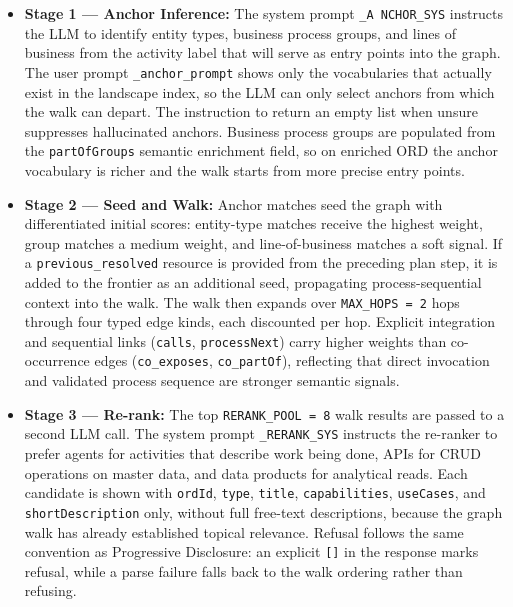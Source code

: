 \begin{itemize}
  \item \textbf{Stage 1 --- Anchor Inference:} The system prompt \texttt{\_A  NCHOR\_SYS} instructs the LLM to identify entity types, business process groups, and lines of business from the activity label that will serve as entry points into the graph. The user prompt \texttt{\_anchor\_prompt} shows only the vocabularies that actually exist in the landscape index, so the LLM can only select anchors from which the walk can depart. The instruction to return an empty list when unsure suppresses hallucinated anchors. Business process groups are populated from the \texttt{partOfGroups} semantic enrichment field, so on enriched ORD the anchor vocabulary is richer and the walk starts from more precise entry points.

  \item \textbf{Stage 2 --- Seed and Walk:} Anchor matches seed the graph with differentiated initial scores: entity-type matches receive the highest weight, group matches a medium weight, and line-of-business matches a soft signal. If a \texttt{previous\_resolved} resource is provided from the preceding plan step, it is added to the frontier as an additional seed, propagating process-sequential context into the walk. The walk then expands over \texttt{MAX\_HOPS = 2} hops through four typed edge kinds, each discounted per hop. Explicit integration and sequential links (\texttt{calls}, \texttt{processNext}) carry higher weights than co-occurrence edges (\texttt{co\_exposes}, \texttt{co\_partOf}), reflecting that direct invocation and validated process sequence are stronger semantic signals.

  \item \textbf{Stage 3 --- Re-rank:} The top \texttt{RERANK\_POOL = 8} walk results are passed to a second LLM call. The system prompt \texttt{\_RERANK\_SYS} instructs the re-ranker to prefer agents for activities that describe work being done, APIs for CRUD operations on master data, and data products for analytical reads. Each candidate is shown with \texttt{ordId}, \texttt{type}, \texttt{title}, \texttt{capabilities}, \texttt{useCases}, and \texttt{shortDescription} only, without full free-text descriptions, because the graph walk has already established topical relevance. Refusal follows the same convention as Progressive Disclosure: an explicit \texttt{[]} in the response marks refusal, while a parse failure falls back to the walk ordering rather than refusing.
\end{itemize}

